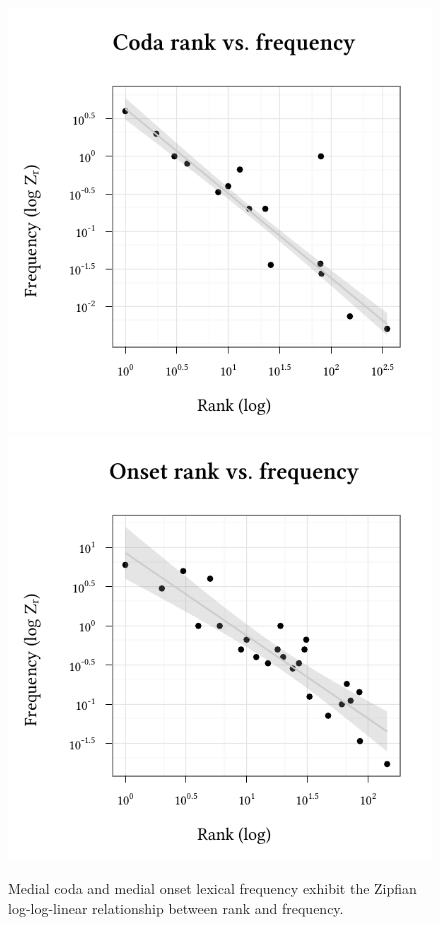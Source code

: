 \begin{figure}
\centering
\includegraphics{coda.pdf} 
\includegraphics{onset.pdf}
\caption{Medial coda and medial onset lexical frequency exhibit the Zipfian log-log-linear relationship between rank and frequency.}
\label{codaonset}
\end{figure}

